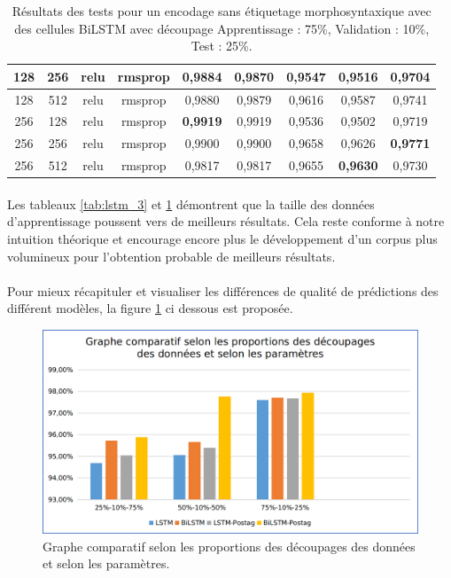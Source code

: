 \begin{table}[H]
{\begin{tabular}{|c|c|c|c|c|c|c|c|c|}
				128 & 256 & relu & rmsprop & 0,9884 & 0,9870 & 0,9547 & 0,9516 & 0,9704 \\ \hline
				128 & 512 & relu & rmsprop & 0,9880 & 0,9879 & 0,9616 & 0,9587 & 0,9741 \\ \hline
				256 & 128 & relu & rmsprop & \textbf{0,9919} & 0,9919 & 0,9536 & 0,9502 & 0,9719 \\ \hline
				\rowcolor[HTML]{96FFFB} 
				256 & 256 & relu & rmsprop & 0,9900 & 0,9900 & 0,9658 & 0,9626 & \textbf{0,9771} \\ \hline
				256 & 512 & relu & rmsprop & 0,9817 & 0,9817 & 0,9655 & \textbf{0,9630} & 0,9730 \\ \hline
			\end{tabular}%
		}
		\caption{Résultats des tests pour un encodage sans étiquetage morphosyntaxique avec des cellules BiLSTM avec découpage Apprentissage : 75\%, Validation : 10\%, Test : 25\%.}
		\label{tab:bilstm_3}
	\end{table}
	\paragraph{}
	Les tableaux \ref{tab:lstm_3} et \ref{tab:bilstm_3} démontrent que la taille des données d'apprentissage poussent vers de meilleurs résultats. Cela reste conforme à notre intuition théorique et encourage encore plus le développement d'un corpus plus volumineux pour l'obtention probable de meilleurs résultats.
	
	\paragraph{}
	Pour mieux récapituler et visualiser les différences de qualité de prédictions des différent modèles, la figure \ref{compare} ci dessous est proposée.
	
	\begin{figure}[H]
		\centering
		\includegraphics[width=.9\linewidth]{images/implementation/graphs.png} 
		\caption{Graphe comparatif selon les proportions des découpages des données et selon les paramètres.}
		\label{compare}
	\end{figure}
